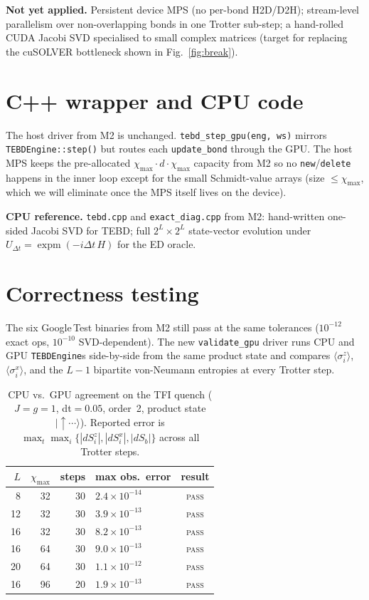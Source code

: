 \documentclass[11pt]{article}
\begin{document}
\textbf{Not yet applied.} Persistent device MPS (no per-bond H2D/D2H);
stream-level parallelism over non-overlapping bonds in one Trotter
sub-step; a hand-rolled CUDA Jacobi SVD specialised to small complex
matrices (target for replacing the cuSOLVER bottleneck shown in
Fig.~\ref{fig:break}).

\section{C++ wrapper and CPU code}
The host driver from M2 is unchanged. \texttt{tebd\_step\_gpu(eng, ws)}
mirrors \texttt{TEBDEngine::step()} but routes each
\texttt{update\_bond} through the GPU. The host MPS keeps the
pre-allocated $\chi_\text{max}\cdot d\cdot\chi_\text{max}$ capacity from
M2 so no \texttt{new}/\texttt{delete} happens in the inner loop
except for the small Schmidt-value arrays (size $\le\chi_\text{max}$,
which we will eliminate once the MPS itself lives on the device).

\textbf{CPU reference.} \texttt{tebd.cpp} and \texttt{exact\_diag.cpp}
from M2: hand-written one-sided Jacobi SVD for TEBD; full $2^L{\times}2^L$
state-vector evolution under
$U_{\Delta t}=\operatorname{expm}(-i\Delta t\,H)$ for the ED oracle.

\section{Correctness testing}\label{sec:correct}
The six Google\,Test binaries from M2 still pass at the same tolerances
($10^{-12}$ exact ops, $10^{-10}$ SVD-dependent). The new
\texttt{validate\_gpu} driver runs CPU and GPU \texttt{TEBDEngine}s
side-by-side from the same product state and compares
$\langle\sigma^z_i\rangle$, $\langle\sigma^x_i\rangle$, and the $L{-}1$
bipartite von-Neumann entropies at every Trotter step.

\begin{table}[h]
\centering
\caption{CPU vs.\ GPU agreement on the TFI quench
($J{=}g{=}1$, dt$=0.05$, order~2, product state $|{\uparrow}\cdots\rangle$).
Reported error is
$\max_t \max_i\{|dS^z_i|, |dS^x_i|, |dS_b|\}$ across all Trotter steps.}
\label{tab:correct}
\small
\begin{tabular}{@{}rrrlc@{}}
\toprule
$L$ & $\chi_{\max}$ & steps & max obs.\ error & result \\
\midrule
 8 & 32 & 30 & $2.4\times10^{-14}$ & \textsc{pass}\\
12 & 32 & 30 & $3.9\times10^{-13}$ & \textsc{pass}\\
16 & 32 & 30 & $8.2\times10^{-13}$ & \textsc{pass}\\
16 & 64 & 30 & $9.0\times10^{-13}$ & \textsc{pass}\\
20 & 64 & 30 & $1.1\times10^{-12}$ & \textsc{pass}\\
16 & 96 & 20 & $1.9\times10^{-13}$ & \textsc{pass}\\
\bottomrule
\end{tabular}
\end{table}
\end{document}
